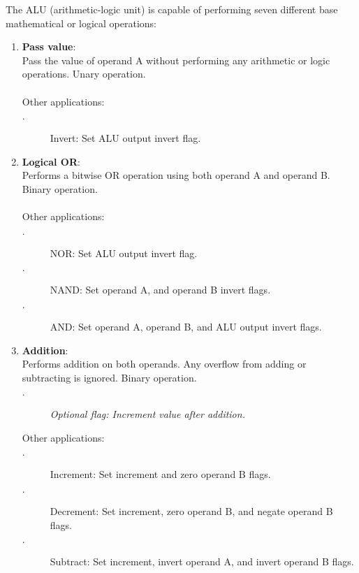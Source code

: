 \documentclass{article}
\begin{document}
			The ALU (arithmetic-logic unit) is capable of performing seven different base mathematical or logical operations:
			
			\begin{enumerate}
				\item \textbf{Pass value}: \\
				Pass the value of operand A without performing any arithmetic or logic operations. Unary operation.\\
				\\
				Other applications:
				\begin{description}
					\item[$\cdot$] Invert: Set ALU output invert flag.
				\end{description}
				
				\item \textbf{Logical OR}: \\
				Performs a bitwise OR operation using both operand A and operand B. Binary operation.\\
				\\
				Other applications:
				\begin{description}
					\item[$\cdot$] NOR: Set ALU output invert flag.
					\item[$\cdot$] NAND: Set operand A, and operand B invert flags.
					\item[$\cdot$] AND: Set operand A, operand B, and ALU output invert flags.
				\end{description}
				
				\item \textbf{Addition}: \\
				Performs addition on both operands. Any overflow from adding or subtracting is ignored. Binary operation.
				\begin{description}
					\item[$\cdot$] \textit{Optional flag: Increment value after addition.}
				\end{description}
				Other applications: 
				\begin{description}
					\item[$\cdot$] Increment: Set increment and zero operand B flags.
					\item[$\cdot$] Decrement: Set increment, zero operand B, and negate operand B flags.
					\item[$\cdot$] Subtract: Set increment, invert operand A, and invert operand B flags.
				\end{description}
				

\end{enumerate}
\end{document}
